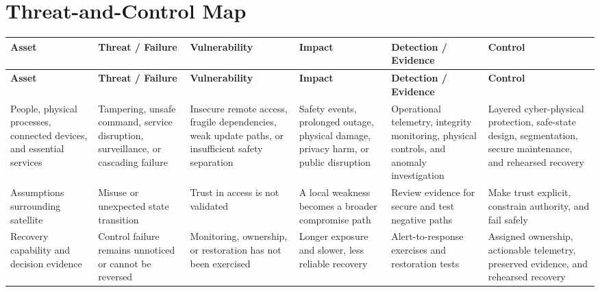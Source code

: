 \documentclass[11pt]{article}
\begin{document}
\section*{Threat-and-Control Map}
\begingroup\scriptsize\setlength{\tabcolsep}{2pt}
\begin{longtable}{>{\RaggedRight\arraybackslash}p{}>{\RaggedRight\arraybackslash}p{}>{\RaggedRight\arraybackslash}p{}>{\RaggedRight\arraybackslash}p{}>{\RaggedRight\arraybackslash}p{}>{\RaggedRight\arraybackslash}p{}}
\toprule\rowcolor{Navy}\color{white}\textbf{Asset} & \color{white}\textbf{Threat / Failure} & \color{white}\textbf{Vulnerability} & \color{white}\textbf{Impact} & \color{white}\textbf{Detection / Evidence} & \color{white}\textbf{Control}\\\midrule
\endfirsthead
\toprule\rowcolor{Navy}\color{white}\textbf{Asset} & \color{white}\textbf{Threat / Failure} & \color{white}\textbf{Vulnerability} & \color{white}\textbf{Impact} & \color{white}\textbf{Detection / Evidence} & \color{white}\textbf{Control}\\\midrule
\endhead
People, physical processes, connected devices, and essential services & Tampering, unsafe command, service disruption, surveillance, or cascading failure & Insecure remote access, fragile dependencies, weak update paths, or insufficient safety separation & Safety events, prolonged outage, physical damage, privacy harm, or public disruption & Operational telemetry, integrity monitoring, physical controls, and anomaly investigation & Layered cyber-physical protection, safe-state design, segmentation, secure maintenance, and rehearsed recovery\\\midrule
Assumptions surrounding satellite & Misuse or unexpected state transition & Trust in access is not validated & A local weakness becomes a broader compromise path & Review evidence for secure and test negative paths & Make trust explicit, constrain authority, and fail safely\\\midrule
Recovery capability and decision evidence & Control failure remains unnoticed or cannot be reversed & Monitoring, ownership, or restoration has not been exercised & Longer exposure and slower, less reliable recovery & Alert-to-response exercises and restoration tests & Assigned ownership, actionable telemetry, preserved evidence, and rehearsed recovery\\\midrule
\bottomrule
\end{longtable}
\endgroup
\end{document}
